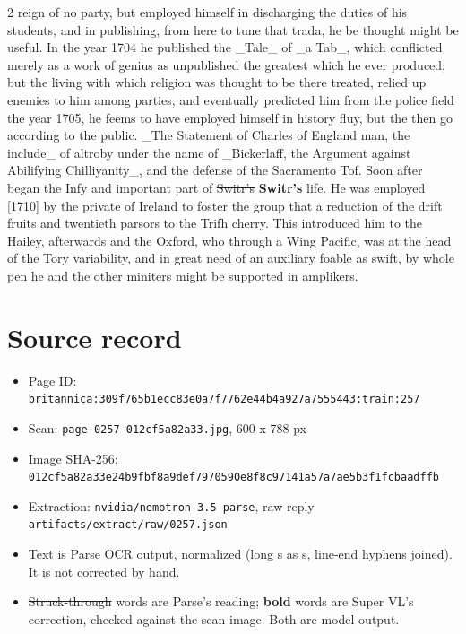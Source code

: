 \documentclass[10pt]{article}
\begin{document}
\begin{multicols}{2}
reign of no party, but employed himself in discharging the duties of his students, and in publishing, from here to tune that trada, he be thought might be useful. In the year 1704 he published the \_Tale\_ of \_a Tab\_, which conflicted merely as a work of genius as unpublished the greatest which he ever produced; but the living with which religion was thought to be there treated, relied up enemies to him among parties, and eventually predicted him from the police field the year 1705, he feems to have employed himself in history fluy, but the then go according to the public. \_The Statement of Charles of England man, the include\_ of altroby under the name of \_Bickerlaff, the Argument against Abilifying Chilliyanity\_, and the defense of the Sacramento Tof. Soon after began the Infy and important part of \sout{Switr’s} \textbf{Switr's} life. He was employed [1710] by the private of Ireland to foster the group that a reduction of the drift fruits and twentieth parsors to the Trifh cherry. This introduced him to the Hailey, afterwards and the Oxford, who through a Wing Pacific, was at the head of the Tory variability, and in great need of an auxiliary foable as swift, by whole pen he and the other miniters might be supported in amplikers.
\end{multicols}
\section*{Source record}
\begin{itemize}
\item Page ID: \texttt{britannica:309f765b1ecc83e0a7f7762e44b4a927a7555443:train:257}
\item Scan: \texttt{page-0257-012cf5a82a33.jpg}, 600 x 788 px
\item Image SHA-256: \texttt{\small 012cf5a82a33e24b9fbf8a9def7970590e8f8c97141a57a7ae5b3f1fcbaadffb}
\item Extraction: \texttt{nvidia/nemotron-3.5-parse}, raw reply \texttt{artifacts/extract/raw/0257.json}
\item Text is Parse OCR output, normalized (long s as s, line-end hyphens joined). It is not corrected by hand.
\item \sout{Struck-through} words are Parse's reading; \textbf{bold} words are Super VL's correction, checked against the scan image. Both are model output.
\end{itemize}
\end{document}
